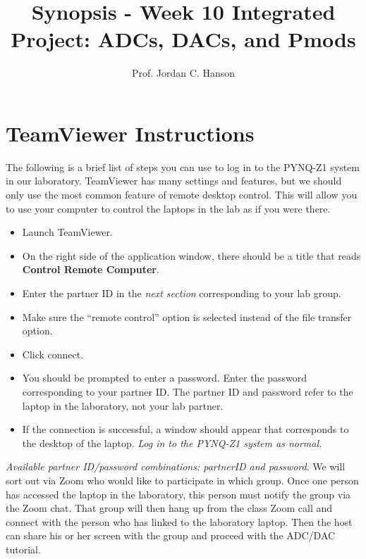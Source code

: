 \documentclass{article}
\begin{document}
\title{Synopsis - Week 10 Integrated Project: ADCs, DACs, and Pmods}
\author{Prof. Jordan C. Hanson}

\maketitle

\section{TeamViewer Instructions}

The following is a brief list of steps you can use to log in to the PYNQ-Z1 system in our laboratory.  TeamViewer has many settings and features, but we should only use the most common feature of remote desktop control.  This will allow you to use your computer to control the laptops in the lab as if you were there.

\begin{itemize}
\item Launch TeamViewer.
\item On the right side of the application window, there should be a title that reads \textbf{Control Remote Computer}.
\item Enter the partner ID in the \textit{next section} corresponding to your lab group.
\item Make sure the ``remote control'' option is selected instead of the file transfer option.
\item Click connect.
\item You should be prompted to enter a password.  Enter the password corresponding to your partner ID.  The partner ID and password refer to the laptop in the laboratory, not your lab partner.
\item If the connection is successful, a window should appear that corresponds to the desktop of the laptop.  \textit{Log in to the PYNQ-Z1 system as normal.}  
\end{itemize}

\textit{Available partner ID/password combinations: partnerID and password}.  We will sort out via Zoom who would like to participate in which group.  Once one person has accessed the laptop in the laboratory, this person must notify the group via the Zoom chat.  That group will then hang up from the class Zoom call and connect with the person who has linked to the laboratory laptop.  Then the host can share his or her screen with the group and proceed with the ADC/DAC tutorial.
\end{document}

